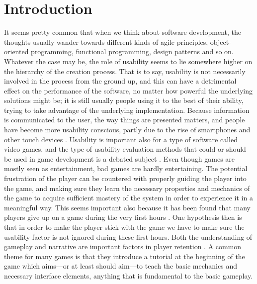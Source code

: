 \chapter{Introduction}
It seems pretty common that when we think about software development, the thoughts usually wander towards different kinds of agile principles, object-oriented programming, functional programming, design patterns and so on. Whatever the case may be, the role of usability seems to lie somewhere higher on the hierarchy of the creation process. That is to say, usability is not necessarily involved in the process from the ground up, and this can have a detrimental effect on the performance of the software, no matter how powerful the underlying solutions might be; it is still usually people using it to the best of their ability, trying to take advantage of the underlying implementation. Because information is communicated to the user, the way things are presented matters, and people have become more usability conscious, partly due to the rise of smartphones and other touch devices \cite{Chen2015}. Usability is important also for a type of software called video games, and the type of usability evaluation methods that could or should be used in game development is a debated subject \cite{Bernhaupt2007}. Even though games are mostly seen as entertainment, bad games are hardly entertaining. The potential frustration of the player can be countered with properly guiding the player into the game, and making sure they learn the necessary properties and mechanics of the game to acquire sufficient mastery of the system in order to experience it in a meaningful way. This seems important also because it has been found that many players give up on a game during the very first hours \cite{Bauckhage2012}. One hypothesis then is that in order to make the player stick with the game we have to make sure the usability factor is not ignored during these first hours. Both the understanding of gameplay and narrative are important factors in player retention \cite{Cheung2014}. A common theme for many games is that they introduce a tutorial at the beginning of the game which aims---or at least should aim---to teach the basic mechanics and necessary interface elements, anything that is fundamental to the basic gameplay. 

